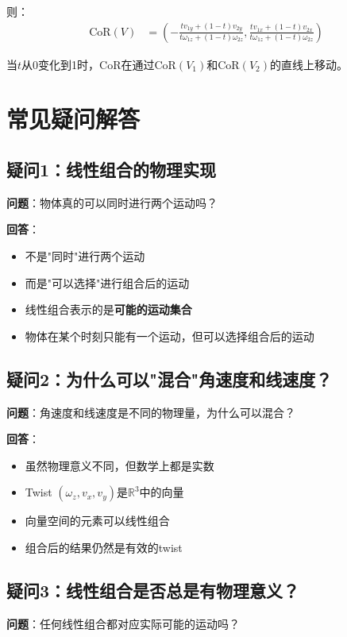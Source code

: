 \documentclass[12pt,a4paper]{article}
\begin{document}
则：
\begin{align}
\text{CoR}(V) &= \left(-\frac{t v_{1y} + (1-t) v_{2y}}{t \omega_{1z} + (1-t) \omega_{2z}}, \frac{t v_{1x} + (1-t) v_{2x}}{t \omega_{1z} + (1-t) \omega_{2z}}\right)
\end{align}

当$t$从0变化到1时，CoR在通过$\text{CoR}(V_1)$和$\text{CoR}(V_2)$的直线上移动。

\section{常见疑问解答}

\subsection{疑问1：线性组合的物理实现}

\textbf{问题}：物体真的可以同时进行两个运动吗？

\textbf{回答}：
\begin{itemize}
\item 不是"同时"进行两个运动
\item 而是"可以选择"进行组合后的运动
\item 线性组合表示的是\textbf{可能的运动集合}
\item 物体在某个时刻只能有一个运动，但可以选择组合后的运动
\end{itemize}

\subsection{疑问2：为什么可以"混合"角速度和线速度？}

\textbf{问题}：角速度和线速度是不同的物理量，为什么可以混合？

\textbf{回答}：
\begin{itemize}
\item 虽然物理意义不同，但数学上都是实数
\item Twist $(\omega_z, v_x, v_y)$是$\mathbb{R}^3$中的向量
\item 向量空间的元素可以线性组合
\item 组合后的结果仍然是有效的twist
\end{itemize}

\subsection{疑问3：线性组合是否总是有物理意义？}

\textbf{问题}：任何线性组合都对应实际可能的运动吗？
\end{document}
